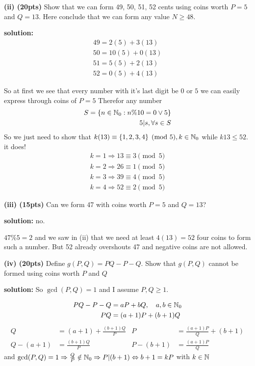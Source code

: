 \documentclass{article}
\begin{document}
\textbf{(ii)  (20pts)}
Show that we can form 49, 50, 51, 52 cents using coins worth
$P=5$ and $Q=13$. Here conclude that we can form any value 
$N \geq 48$.

\textbf{solution:}
\begin{align*}
    49 = 2(5) + 3(13) \\
    50 = 10(5) + 0(13) \\
    51 = 5(5) + 2(13) \\
    52 = 0(5) + 4(13) 
\end{align*}


So at first we see that every number with it's last digit be
$0$ or $5$ we can easily express through coins of $P = 5$
Therefor any number
\begin{align*}
S = \{ n \in \mathbb{N}_{0} : n \%10 = 0 \lor 5 \} \\
5|s , \forall s \in S
\end{align*}
So we just need to show that $k(13) \equiv \{1,2,3,4\} \pmod{5}, k \in \mathbb{N}_{0}$
while $k13 \leq 52$.
it does!
\begin{align*}
    k = 1 \Rightarrow 13 \equiv 3 \pmod{5} \\
    k = 2 \Rightarrow 26 \equiv 1 \pmod{5} \\
    k = 3 \Rightarrow 39 \equiv 4 \pmod{5} \\
    k = 4 \Rightarrow 52 \equiv 2 \pmod{5} 
\end{align*}

\textbf{(iii) (15pts)}
Can we form 47 with coins worth $P=5$ and $Q=13$?

\textbf{solution:}
no. 

$47\%5 = 2$ and we saw in (ii) that we need at least $4(13)=52$
four coins to form such a number. But 52 already overshouts 47 
and negative coins are not allowed.

\textbf{(iv) (20pts)}
Define $g(P,Q) = PQ - P -Q$.
Show that $g(P,Q)$ cannot be formed using coins worth $P$ and $Q$

\textbf{solution:}
So $\gcd(P,Q) = 1$ and I assume $P, Q \geq 1$.

\begin{align}
    PQ - P - Q &= aP + bQ , \hspace{10pt} a,b \in \mathbb{N}_{0}\\
    PQ &= (a+1)P + (b+1)Q
\end{align}
\begin{align*}    
    Q &= (a+1) + \frac{(b+1)Q}{P} 
    &P &= \frac{(a+1)P}{Q}  + (b+1)
    \\
    Q - (a+1)&= \frac{(b+1)Q}{P} 
    & P - (b+1)&= \frac{(a+1)P}{Q}
\end{align*}
and $\gcd(P,Q) = 1 \Rightarrow 
\frac{Q}{P} \notin \mathbb{N}_{0} \Rightarrow
P|(b+1) \Leftrightarrow
b+1 = kP$ with $k \in \mathbb{N}$
\end{document}
